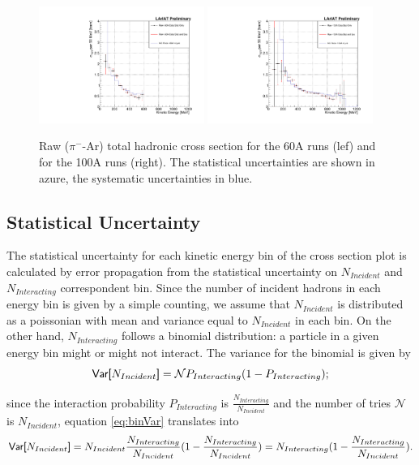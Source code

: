 \begin{figure}
\centering  
\includegraphics[width=0.48\textwidth]{Chapter-6/Images/Plots60A_MCData_XS_StatSyst.pdf}
\includegraphics[width=0.48\textwidth]{Chapter-6/Images/Plots100A_MCData_XS_StatSyst.pdf}
\caption{Raw ($\pi^-$-Ar) total hadronic cross section for the 60A runs (lef) and for the 100A runs (right). The statistical uncertainties are shown in azure, the systematic uncertainties in blue.}
\label{fig:XSRaw}
\end{figure}


\subsection{Statistical Uncertainty}\label{ch:StatUncertaintyXSRaw}
The statistical uncertainty for each kinetic energy bin of the cross section plot is calculated by error propagation from the statistical uncertainty on $N_{Incident}$ and $N_{Interacting}$ correspondent bin.  Since the number of incident hadrons in each energy bin is given by a simple counting, we assume that $N_{Incident}$ is distributed as a poissonian with mean and variance equal to $N_{Incident}$ in each bin.  
On the other hand, $N_{Interacting}$ follows a binomial distribution: a particle in a given energy bin might or might not interact.  The variance for the binomial is given by  
\begin{equation}
\text{\textsf{Var[$N_{Incident}$]}} = \mathcal{N}P_{Interacting}(1-P_{Interacting});
\label{eq:binVar}
\end{equation}

since the interaction probability $P_{Interacting}$ is $\frac{ N_{Interacting}}{N_{Incident}}$ and the number of tries $\mathcal{N}$ is $N_{Incident}$, equation \ref{eq:binVar} translates into
\begin{equation}
\text{\textsf{Var[$N_{Incident}$]}} = N_{Incident}\frac{ N_{Interacting}}{N_{Incident}} (1-\frac{ N_{Interacting}}{N_{Incident}}) = N_{Interacting}(1-\frac{ N_{Interacting}}{N_{Incident}}). 
\end{equation}

